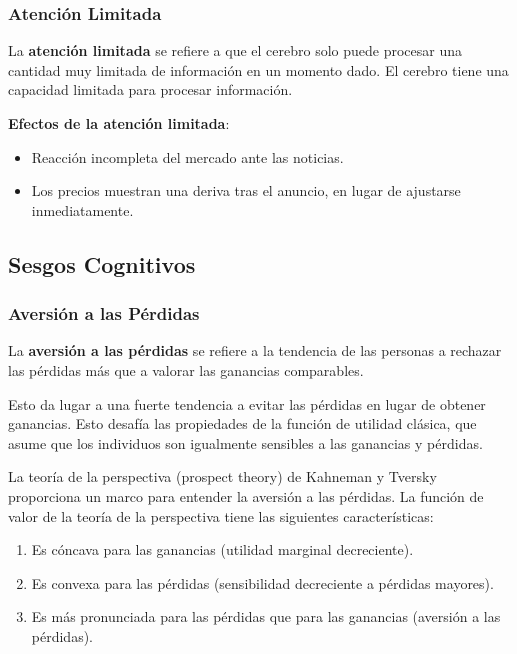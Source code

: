 \subsubsection{Atención Limitada}

\begin{definicion}
La \textbf{atención limitada} se refiere a que el cerebro solo puede procesar una cantidad muy limitada de información en un momento dado. El cerebro tiene una capacidad limitada para procesar información.
\end{definicion}

\textbf{Efectos de la atención limitada}:
\begin{itemize}
\item Reacción incompleta del mercado ante las noticias.
\item Los precios muestran una deriva tras el anuncio, en lugar de ajustarse inmediatamente.
\end{itemize}

\subsection{Sesgos Cognitivos}

\subsubsection{Aversión a las Pérdidas}

\begin{definicion}
La \textbf{aversión a las pérdidas} se refiere a la tendencia de las personas a rechazar las pérdidas más que a valorar las ganancias comparables.
\end{definicion}

Esto da lugar a una fuerte tendencia a evitar las pérdidas en lugar de obtener ganancias. Esto desafía las propiedades de la función de utilidad clásica, que asume que los individuos son igualmente sensibles a las ganancias y pérdidas.

La teoría de la perspectiva (prospect theory) de Kahneman y Tversky proporciona un marco para entender la aversión a las pérdidas. La función de valor de la teoría de la perspectiva tiene las siguientes características:

\begin{enumerate}
\item Es cóncava para las ganancias (utilidad marginal decreciente).
\item Es convexa para las pérdidas (sensibilidad decreciente a pérdidas mayores).
\item Es más pronunciada para las pérdidas que para las ganancias (aversión a las pérdidas).
\end{enumerate}


